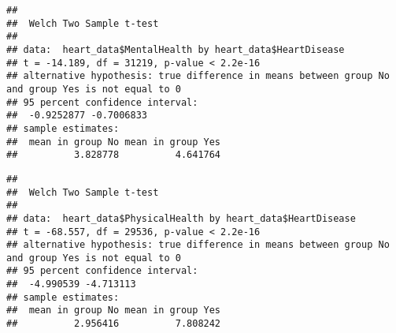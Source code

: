 \documentclass[
]{article}
\newenvironment{Shaded}{\begin{snugshade}}{\end{snugshade}}
\newcommand{\CommentTok}[1]{\textcolor[rgb]{0.56,0.35,0.01}{\textit{#1}}}
\newcommand{\FunctionTok}[1]{\textcolor[rgb]{0.00,0.00,0.00}{#1}}
\newcommand{\NormalTok}[1]{#1}
\newcommand{\SpecialCharTok}[1]{\textcolor[rgb]{0.00,0.00,0.00}{#1}}
\begin{document}
\begin{Shaded}
\end{Shaded}

\begin{verbatim}
## 
##  Welch Two Sample t-test
## 
## data:  heart_data$MentalHealth by heart_data$HeartDisease
## t = -14.189, df = 31219, p-value < 2.2e-16
## alternative hypothesis: true difference in means between group No and group Yes is not equal to 0
## 95 percent confidence interval:
##  -0.9252877 -0.7006833
## sample estimates:
##  mean in group No mean in group Yes 
##          3.828778          4.641764
\end{verbatim}

\begin{Shaded}
\end{Shaded}

\begin{verbatim}
## 
##  Welch Two Sample t-test
## 
## data:  heart_data$PhysicalHealth by heart_data$HeartDisease
## t = -68.557, df = 29536, p-value < 2.2e-16
## alternative hypothesis: true difference in means between group No and group Yes is not equal to 0
## 95 percent confidence interval:
##  -4.990539 -4.713113
## sample estimates:
##  mean in group No mean in group Yes 
##          2.956416          7.808242
\end{verbatim}

\begin{Shaded}
\end{Shaded}
\end{document}
